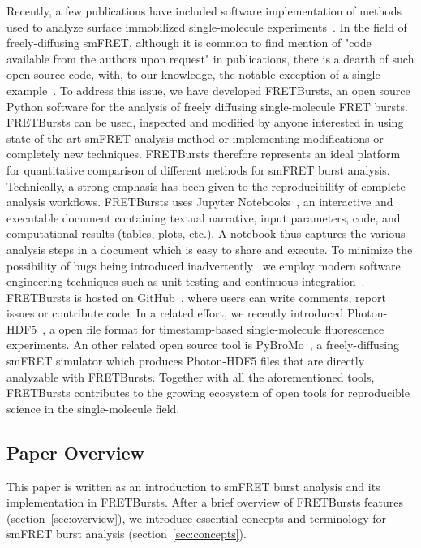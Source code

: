 Recently, a few publications have included software implementation of methods used to analyze
surface immobilized single-molecule experiments~\cite{Bronson_2009,Greenfeld_2012, K_nig_2013}.
In the field of freely-diffusing smFRET, although it is common to find mention of "code available from the authors upon request" in publications, there is a dearth of such open source code, with, to our knowledge, the notable exception of a single example~\cite{Murphy2014}.
To address this issue, we have developed FRETBursts,
an open source Python software for the analysis of freely diffusing single-molecule FRET bursts.
FRETBursts can be used, inspected and modified by anyone interested in using state-of-the art smFRET analysis method or implementing modifications or completely new techniques. FRETBursts therefore represents an ideal platform
for quantitative comparison of different methods for smFRET burst analysis.
Technically, a strong emphasis has been given to the reproducibility of complete analysis
workflows. FRETBursts uses Jupyter Notebooks~\cite{Shen_2014},
an interactive and executable document containing textual narrative, input parameters, 
code, and computational results (tables, plots, etc.). A notebook thus captures the various analysis steps
in a document which is easy to share and execute.
To minimize the possibility of bugs being introduced inadvertently~\cite{Soergel_2015} 
we employ modern software engineering techniques
such as unit testing and continuous integration~\cite{Wilson_2014}.
FRETBursts is hosted on GitHub~\cite{Blischak_2016,Prli__2012},
where users can write comments, report issues or contribute code.
In a related effort, we recently introduced Photon-HDF5~\cite{Ingargiola2016},
a open file format for timestamp-based single-molecule fluorescence
experiments. An other related open source tool is PyBroMo~\cite{Ingargiola_2016},
a freely-diffusing smFRET simulator which produces Photon-HDF5 files that are
directly analyzable with FRETBursts.
Together with all the aforementioned tools, FRETBursts contributes to the growing 
ecosystem of open tools for reproducible science in the single-molecule field.

\subsection{Paper Overview}
This paper is written as an introduction to smFRET burst analysis and its implementation in FRETBursts.
After a brief overview of FRETBursts features (section~\ref{sec:overview}),
we introduce essential concepts and terminology for smFRET burst analysis 
(section~\ref{sec:concepts}).

